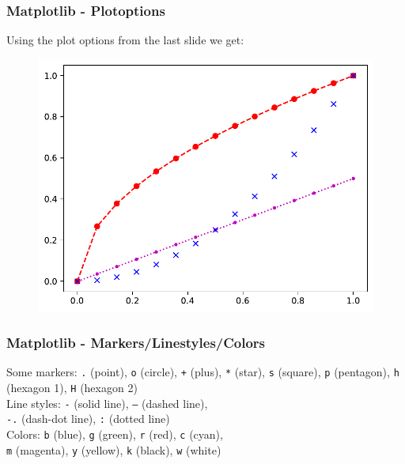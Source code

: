 \documentclass{beamer}
\begin{document}
\begin{frame}
  \frametitle{Matplotlib - Plotoptions}
  Using the plot options from the last slide we get:
  \begin{figure}[H]
    \centering
    \begin{samepage}
        \includegraphics[width=0.65\linewidth]{fig/matplotlib3.pdf}
    \end{samepage}
\end{figure}
\end{frame}

\begin{frame}
  \frametitle{Matplotlib - Markers/Linestyles/Colors}
  Some markers: \texttt{.} (point), \texttt{o} (circle), \texttt{+} (plus), \texttt{*} (star), \texttt{s} (square), \texttt{p} (pentagon), \texttt{h} (hexagon 1), \texttt{H} (hexagon 2)\\\vspace{5mm}
  Line styles: \texttt{-} (solid line), \texttt{--} (dashed line),\\\texttt{-.} (dash-dot line), \texttt{:} (dotted line)\\\vspace{5mm}
  Colors: \texttt{b} (blue), \texttt{g} (green), \texttt{r} (red), \texttt{c} (cyan),\\\texttt{m} (magenta), \texttt{y} (yellow), \texttt{k} (black), \texttt{w} (white)\\
\end{frame}
\end{document}
